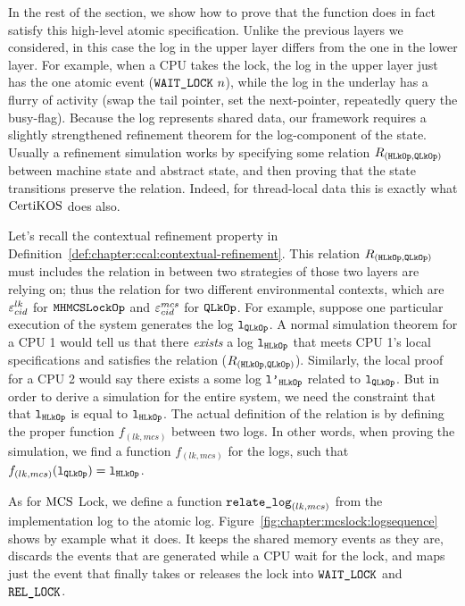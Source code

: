 In the rest of the section, we show how to prove that the function
does in fact satisfy this high-level atomic specification.
Unlike the previous layers we considered, in this case the log in the
upper layer differs from the one in the lower layer. For example, when
a CPU takes the lock, the log in the upper layer just has the one
atomic event (${\mathrm{\texttt{WAIT\_LOCK}}}~{n}$), while the log in the underlay
has a flurry of activity (swap the tail pointer, set the next-pointer,
repeatedly query the busy-flag).
Because the log represents shared data, our framework requires a
slightly strengthened refinement theorem for the log-component of the
state. Usually a refinement simulation works by specifying some
relation $R_{({\mathrm{\texttt{HLkOp}}}, {\mathrm{\texttt{QLkOp}}})}$ between machine state and abstract state, and then
proving that the state transitions preserve the relation. Indeed, for
thread-local data this is exactly what $\mathrm{CertiKOS}$ does also.

Let's recall the contextual refinement property in Definition~\ref{def:chapter:ccal:contextual-refinement}. 
This relation   $R_{({\mathrm{\texttt{HLkOp}}}, {\mathrm{\texttt{QLkOp}}})}$ must includes the relation in between 
two strategies of those two layers are relying on; 
thus the relation for two different environmental contexts, which are ${\varepsilon}^{lk}_{cid}$ for ${\mathrm{\texttt{MHMCSLockOp}}}$ and ${\varepsilon}^{mcs}_{cid}$ for ${\mathrm{\texttt{QLkOp}}}$.
For example, suppose one particular
execution of the system generates the log ${\mathrm{\texttt{l}}}_{{\mathrm{\texttt{QLkOp}}}}$.  A normal simulation
theorem for a CPU 1 would tell us that there \emph{exists} a log ${\mathrm{\texttt{l}}}_{{\mathrm{\texttt{HLkOp}}}}$
that meets CPU 1's local specifications and satisfies the relation
($R_{({{\mathrm{\texttt{HLkOp}}}}, {{\mathrm{\texttt{QLkOp}}}})}$). 
Similarly, the local proof for a CPU 2 would say there
exists a some log ${\mathrm{\texttt{l'}}}_{{\mathrm{\texttt{HLkOp}}}}$
related to  ${\mathrm{\texttt{l}}}_{{\mathrm{\texttt{QLkOp}}}}$. 
But in order to derive a simulation for the
entire system, we need the constraint that that ${\mathrm{\texttt{l}}}_{{\mathrm{\texttt{HLkOp}}}}$  is equal to
${\mathrm{\texttt{l}}}_{{\mathrm{\texttt{HLkOp}}}}$. 
The actual definition of the relation is by defining the proper function $f_{(lk, mcs)}$ between two logs.
In other words, when proving the simulation,
we find a function $f_{(lk, mcs)}$ for the logs, such that $f_{(lk, mcs)}({\mathrm{\texttt{l}}}_{{\mathrm{\texttt{QLkOp}}}}) = {\mathrm{\texttt{l}}}_{{\mathrm{\texttt{HLkOp}}}}$.


As for  $\mathrm{MCS}$ Lock, we define a function ${\mathrm{\texttt{relate\_log}}}_{(lk, mcs)}$ from the
implementation log to the atomic log. Figure~\ref{fig:chapter:mcslock:logsequence}
shows by example what it does. It keeps the shared memory events as
they are, discards the events that are generated while a CPU wait for
the lock, and maps just the event that finally takes or releases the
lock into ${\mathrm{\texttt{WAIT\_LOCK}}}$ and ${\mathrm{\texttt{REL\_LOCK}}}$.

